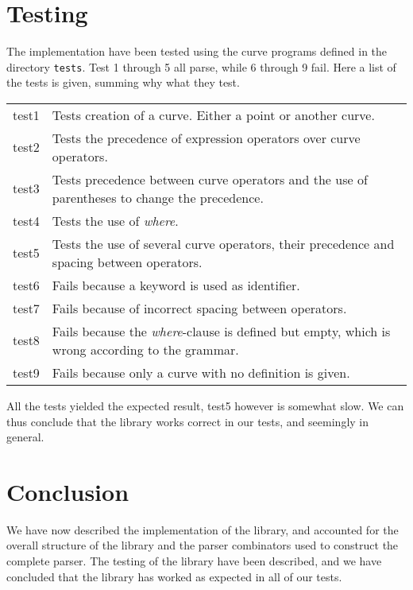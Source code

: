 \documentclass[a4paper, 11pt]{article}
\begin{document}
\section{Testing} %
\label{sec:testing}

The implementation have been tested using the curve programs defined in the directory \texttt{tests}. Test 1 through 5 all parse, while 6 through 9 fail. Here a list of the tests is given, summing why what they test.

\begin{table}[H]
\centering
\begin{tabular}{c|p{}}
    test1 & Tests creation of a curve. Either a point or another curve. \\
    test2 & Tests the precedence of expression operators over curve operators. \\
    test3 & Tests precedence between curve operators and the use of parentheses to change the precedence. \\
    test4 & Tests the use of \emph{where}. \\
    test5 & Tests the use of several curve operators, their precedence and spacing between operators. \\
    test6 & Fails because a keyword is used as identifier. \\
    test7 & Fails because of incorrect spacing between operators. \\
    test8 & Fails because the \emph{where}-clause is defined but empty, which is wrong according to the grammar. \\
    test9 & Fails because only a curve with no definition is given. \\
\end{tabular}
\end{table}

All the tests yielded the expected result, test5 however is somewhat slow. We can thus conclude that the library works correct in our tests, and seemingly in general.


\section{Conclusion} %
\label{sec:conclusion}

We have now described the implementation of the library, and accounted for the overall structure of the library and the parser combinators used to construct the complete parser. The testing of the library have been described, and we have concluded that the library has worked as expected in all of our tests.

\end{document}
